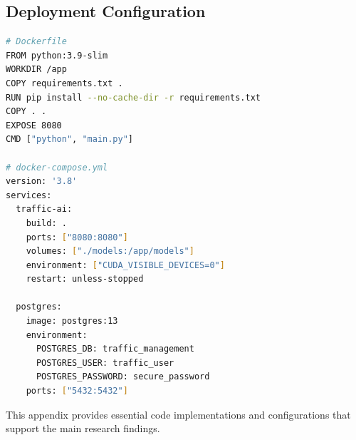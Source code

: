 \subsection{Deployment Configuration}

\begin{lstlisting}[language=bash, caption=Docker Deployment, label=lst:docker_deploy]
# Dockerfile
FROM python:3.9-slim
WORKDIR /app
COPY requirements.txt .
RUN pip install --no-cache-dir -r requirements.txt
COPY . .
EXPOSE 8080
CMD ["python", "main.py"]

# docker-compose.yml
version: '3.8'
services:
  traffic-ai:
    build: .
    ports: ["8080:8080"]
    volumes: ["./models:/app/models"]
    environment: ["CUDA_VISIBLE_DEVICES=0"]
    restart: unless-stopped
  
  postgres:
    image: postgres:13
    environment:
      POSTGRES_DB: traffic_management
      POSTGRES_USER: traffic_user
      POSTGRES_PASSWORD: secure_password
    ports: ["5432:5432"]
\end{lstlisting}

This appendix provides essential code implementations and configurations that support the main research findings. 